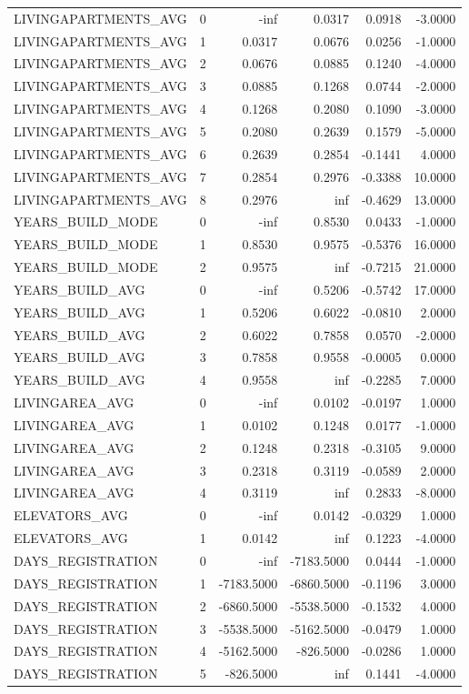 \begin{tabular}{lrrrrr}
LIVINGAPARTMENTS_AVG & 0 & -inf & 0.0317 & 0.0918 & -3.0000 \\
LIVINGAPARTMENTS_AVG & 1 & 0.0317 & 0.0676 & 0.0256 & -1.0000 \\
LIVINGAPARTMENTS_AVG & 2 & 0.0676 & 0.0885 & 0.1240 & -4.0000 \\
LIVINGAPARTMENTS_AVG & 3 & 0.0885 & 0.1268 & 0.0744 & -2.0000 \\
LIVINGAPARTMENTS_AVG & 4 & 0.1268 & 0.2080 & 0.1090 & -3.0000 \\
LIVINGAPARTMENTS_AVG & 5 & 0.2080 & 0.2639 & 0.1579 & -5.0000 \\
LIVINGAPARTMENTS_AVG & 6 & 0.2639 & 0.2854 & -0.1441 & 4.0000 \\
LIVINGAPARTMENTS_AVG & 7 & 0.2854 & 0.2976 & -0.3388 & 10.0000 \\
LIVINGAPARTMENTS_AVG & 8 & 0.2976 & inf & -0.4629 & 13.0000 \\
YEARS_BUILD_MODE & 0 & -inf & 0.8530 & 0.0433 & -1.0000 \\
YEARS_BUILD_MODE & 1 & 0.8530 & 0.9575 & -0.5376 & 16.0000 \\
YEARS_BUILD_MODE & 2 & 0.9575 & inf & -0.7215 & 21.0000 \\
YEARS_BUILD_AVG & 0 & -inf & 0.5206 & -0.5742 & 17.0000 \\
YEARS_BUILD_AVG & 1 & 0.5206 & 0.6022 & -0.0810 & 2.0000 \\
YEARS_BUILD_AVG & 2 & 0.6022 & 0.7858 & 0.0570 & -2.0000 \\
YEARS_BUILD_AVG & 3 & 0.7858 & 0.9558 & -0.0005 & 0.0000 \\
YEARS_BUILD_AVG & 4 & 0.9558 & inf & -0.2285 & 7.0000 \\
LIVINGAREA_AVG & 0 & -inf & 0.0102 & -0.0197 & 1.0000 \\
LIVINGAREA_AVG & 1 & 0.0102 & 0.1248 & 0.0177 & -1.0000 \\
LIVINGAREA_AVG & 2 & 0.1248 & 0.2318 & -0.3105 & 9.0000 \\
LIVINGAREA_AVG & 3 & 0.2318 & 0.3119 & -0.0589 & 2.0000 \\
LIVINGAREA_AVG & 4 & 0.3119 & inf & 0.2833 & -8.0000 \\
ELEVATORS_AVG & 0 & -inf & 0.0142 & -0.0329 & 1.0000 \\
ELEVATORS_AVG & 1 & 0.0142 & inf & 0.1223 & -4.0000 \\
DAYS_REGISTRATION & 0 & -inf & -7183.5000 & 0.0444 & -1.0000 \\
DAYS_REGISTRATION & 1 & -7183.5000 & -6860.5000 & -0.1196 & 3.0000 \\
DAYS_REGISTRATION & 2 & -6860.5000 & -5538.5000 & -0.1532 & 4.0000 \\
DAYS_REGISTRATION & 3 & -5538.5000 & -5162.5000 & -0.0479 & 1.0000 \\
DAYS_REGISTRATION & 4 & -5162.5000 & -826.5000 & -0.0286 & 1.0000 \\
DAYS_REGISTRATION & 5 & -826.5000 & inf & 0.1441 & -4.0000 \\
\bottomrule
\end{tabular}
